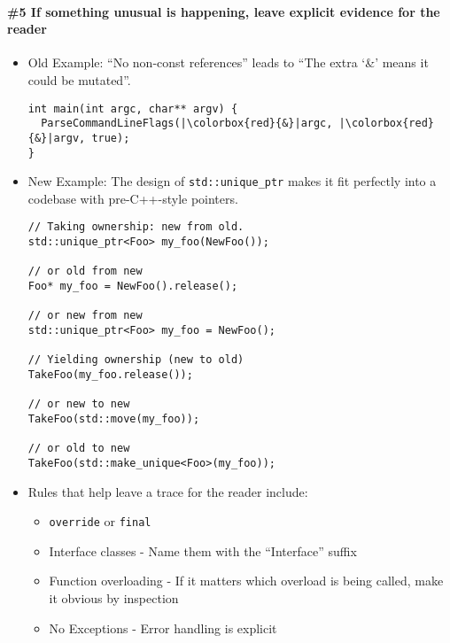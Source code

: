 \paragraph*{\#5 If something unusual is happening, leave explicit evidence for the reader}
\begin{itemize}
    \item Old Example: \enquote{No non-const references} leads to \enquote{The extra \enquote*{\&} means it could be mutated}.
\begin{verbatim}
int main(int argc, char** argv) {
  ParseCommandLineFlags(|\colorbox{red}{&}|argc, |\colorbox{red}{&}|argv, true);
}
\end{verbatim}
    \item New Example: The design of \texttt{std::unique_ptr} makes it fit perfectly into a codebase with pre-C++-style pointers.
    \begin{verbatim}
// Taking ownership: new from old.
std::unique_ptr<Foo> my_foo(NewFoo());

// or old from new
Foo* my_foo = NewFoo().release();

// or new from new
std::unique_ptr<Foo> my_foo = NewFoo();

// Yielding ownership (new to old)
TakeFoo(my_foo.release());

// or new to new
TakeFoo(std::move(my_foo));

// or old to new
TakeFoo(std::make_unique<Foo>(my_foo));
    \end{verbatim}
    \item Rules that help leave a trace for the reader include:
    \begin{itemize}
        \item \texttt{override} or \texttt{final}
        \item Interface classes - Name them with the \enquote{Interface} suffix
        \item Function overloading - If it matters which overload is being called, make it obvious by inspection
        \item No Exceptions - Error handling is explicit
    \end{itemize}
\end{itemize}

